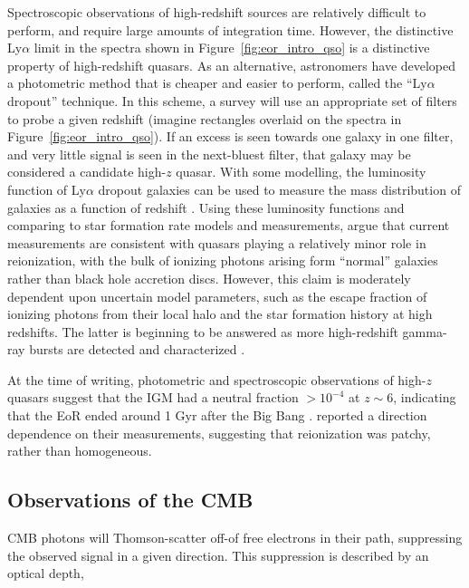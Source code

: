 Spectroscopic observations of high-redshift sources are relatively difficult to perform, and require large amounts of integration time. However, the distinctive Ly$\alpha$ limit in the spectra shown in Figure~\ref{fig:eor_intro_qso} is a distinctive property of high-redshift quasars. As an alternative, astronomers have developed a photometric method that is cheaper and easier to perform, called the ``Ly$\alpha$ dropout'' technique. In this scheme, a survey will use an appropriate set of filters to probe a given redshift (imagine rectangles overlaid on the spectra in Figure~\ref{fig:eor_intro_qso}). If an excess is seen towards one galaxy in one filter, and very little signal is seen in the next-bluest filter, that galaxy may be considered a candidate high-$z$ quasar. With some modelling, the luminosity function of  Ly$\alpha$ dropout galaxies can be used to measure the mass distribution of galaxies as a function of redshift \citep[e.g.][]{Bouwens.15, Bouwens.16}. Using these luminosity functions and comparing to star formation rate models and measurements, \cite{Robertson.15} argue that current measurements are consistent with quasars playing a relatively minor role in reionization, with the bulk of ionizing photons arising form ``normal'' galaxies rather than black hole accretion discs. However, this claim is moderately dependent upon uncertain model parameters, such as the escape fraction of ionizing photons from their local halo \citep{Robertson.13} and the star formation history at high redshifts. The latter is beginning to be answered as more high-redshift gamma-ray bursts are detected and characterized \citep{Wang.09, Robertson.12, Wang.15}.

At the time of writing, photometric and spectroscopic observations of high-$z$ quasars suggest that the IGM had a neutral fraction $>10^{-4}$ at $z\sim 6$, indicating that the EoR ended around 1 Gyr after the Big Bang \citep{Barnett.17}. \cite{Fan.06.2} reported a direction dependence on their measurements, suggesting that reionization was patchy, rather than homogeneous.

\subsection{Observations of the CMB}
CMB photons will Thomson-scatter off-of free electrons in their path, suppressing the observed signal in a given direction. This suppression is described by an optical depth,

